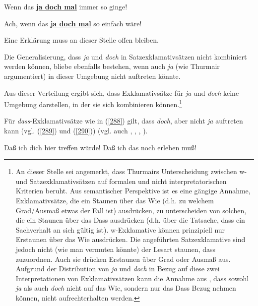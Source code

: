 {\begin{exe}
	\ex\label{286} 
	Wenn das \underline{\textbf{ja doch mal}} immer so ginge!
\end{exe}
\vspace{-0.4cm}
\begin{exe}
	\ex\label{287} 
	Ach, wenn das \underline{\textbf{ja doch mal}} so einfach wäre!
\end{exe}
Eine Erklärung muss an dieser Stelle offen bleiben.} Die Genera\-lisierung, dass \textit{ja} und \textit{doch} in Satzexklamativsätzen nicht kombiniert werden können, bliebe ebenfalls bestehen, wenn auch \textit{ja} (wie Thurmair argumentiert) in dieser Umgebung nicht auftreten könnte. 
									        
Aus dieser Verteilung ergibt sich, dass Exklamativsätze für \textit{ja} und \textit{doch} keine Umgebung darstellen, in der sie sich kombinieren können.\footnote{\label{Fn4}An dieser Stelle sei angemerkt, dass Thurmairs Unterscheidung zwischen w- und Satzexklamativsätzen auf formalen und nicht interpretatorischen Kriterien beruht. Aus semantischer Perspektive ist es eine gängige Annahme, Exklamativsätze, die ein Staunen über das Wie (d.h. zu welchem Grad/Ausmaß etwas der Fall ist) ausdrücken, zu unterscheiden von solchen, die ein Staunen über das Dass ausdrücken (d.h. über die Tatsache, dass ein Sachverhalt an sich gültig ist). w-Exklamative können prinzipiell nur Erstaunen über das Wie ausdrücken. Die angeführten Satzexklamative sind jedoch nicht (wie man vermuten könnte) der Lesart \glq staunen, dass\grq {} zuzuordnen. Auch sie drücken Erstaunen über Grad oder Ausmaß aus. Aufgrund der Distribution von \textit{ja} und \textit{doch} in Bezug auf diese zwei Interpretationen von Exklamativsätzen kann die Annahme aus \citet[161]{Hentschel1986}, dass sowohl \textit{ja} als auch \textit{doch} nicht auf das Wie, sondern nur das Dass Bezug nehmen können, nicht aufrechterhalten werden.}
	
Für \textit{dass}-Exklamativsätze  wie in (\ref{288}) gilt, dass \textit{doch}, aber nicht \textit{ja} auftreten kann (vgl. (\ref{289}) und (\ref{290})) (vgl. auch \citealt[109, Fn 49]{Doherty1985}, \citealt[152]{Zaefferer1988}, \citealt[135]{Meibauer1994}, \citealt[222]{Kwon2005}).

\begin{exe}
	\ex\label{288} 
		\begin{xlist}	
			\ex\label{288a} Daß ich dich hier treffen würde!
			\ex\label{288b} Daß ich das noch erleben muß!
		\end{xlist}
\end{exe}

